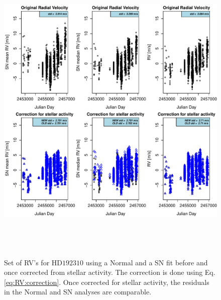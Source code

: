 \documentclass[11pt, oneside]{article}
\begin{document}
\begin{figure} 
   \centering
\includegraphics[height = 6in]{NEW_CORRECTIONHD19231_[3]CorrectionActivity_RadialVelocity_vs_time.pdf} 
   \caption{Set of RV's for $\text{HD}192310$  using a Normal and a SN fit before and once corrected from stellar activity. The correction is done using Eq. \ref{eq:RV:correction}. Once corrected for stellar activity, the residuals in the Normal and SN analyses are comparable.}
   \label{fig:HD192310:correctionRV}
\end{figure}
\end{document}

